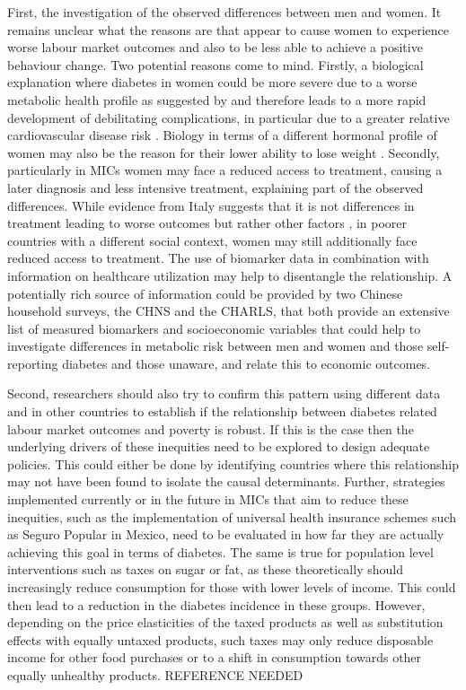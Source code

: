 First, the investigation of the observed differences between men and women. It remains unclear what the reasons are that appear to cause women to experience worse labour market outcomes and also to be less able to achieve a positive behaviour change. Two potential reasons come to mind. Firstly, a biological explanation where diabetes in women could be more severe due to a worse metabolic health profile as suggested by \textcite{Peters2014,Peters2015} and therefore leads to a more rapid development of debilitating complications, in particular due to a greater relative cardiovascular disease risk \parencite{Arnetz2014,Roche2013,Policardo2014,Catalan2015,Engelmann2016,Seghieri2015}. Biology in terms of a different hormonal profile of women may also be the reason for their lower ability to lose weight \parencite{Penno2013}.  Secondly, particularly in \acp{MIC} women may face a reduced access to treatment, causing a later diagnosis and less intensive treatment, explaining part of the observed differences. While evidence from Italy suggests that it is not differences in treatment leading to worse outcomes but rather other factors \parencite{Penno2013}, in poorer countries with a different social context, women may still additionally face reduced access to treatment. The use of biomarker data in combination with information on healthcare utilization may help to disentangle the relationship. A potentially rich source of information could be provided by two Chinese household surveys, the \acl{CHNS} and the \acf{CHARLS}, that both provide an extensive list of measured biomarkers and socioeconomic variables that could help to investigate differences in metabolic risk between men and women and those self-reporting diabetes and those unaware, and relate this to economic outcomes.

Second, researchers should also try to confirm this pattern using different data and in other countries to establish if the relationship between diabetes related labour market outcomes and poverty is robust. If this is the case then the underlying drivers of these inequities need to be explored to design adequate policies. This could either be done by identifying countries where this relationship may not have been found to isolate the causal determinants. Further, strategies implemented currently or in the future in \acp{MIC} that aim to reduce these inequities, such as the implementation of universal health insurance schemes such as Seguro Popular in Mexico, need to be evaluated in how far they are actually achieving this goal in terms of diabetes. The same is true for population level interventions such as taxes on sugar or fat, as these theoretically should increasingly reduce consumption for those with lower levels of income. This could then lead to a reduction in the diabetes incidence in these groups. However, depending on the price elasticities of the taxed products as well as substitution effects with equally untaxed products, such taxes may only reduce disposable income for other food purchases or to a shift in consumption towards other equally unhealthy products. REFERENCE NEEDED


